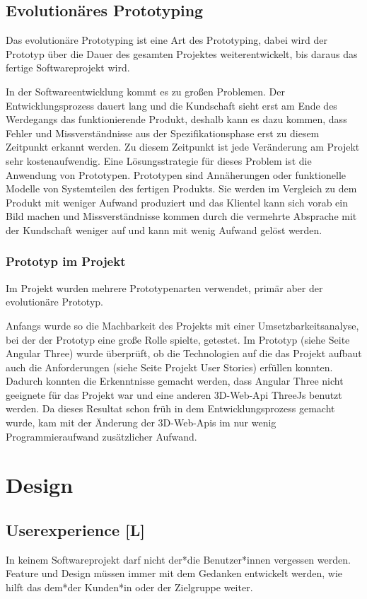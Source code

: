\subsection{Evolutionäres Prototyping}
\label{ch::ongoing-prototyping}
Das evolutionäre Prototyping ist eine Art des Prototyping, dabei wird der Prototyp über die Dauer des gesamten Projektes weiterentwickelt, bis daraus das fertige Softwareprojekt wird.

In der Softwareentwicklung kommt es zu großen Problemen. Der Entwicklungsprozess dauert lang und die Kundschaft sieht erst am Ende des Werdegangs das funktionierende Produkt, deshalb kann es dazu kommen, dass Fehler und Missverständnisse aus der Spezifikationsphase erst zu diesem Zeitpunkt erkannt werden. Zu diesem Zeitpunkt ist jede Veränderung am Projekt sehr kostenaufwendig. Eine Lösungsstrategie für dieses Problem ist die Anwendung von Prototypen. Prototypen sind Annäherungen oder funktionelle Modelle von Systemteilen des fertigen Produkts. Sie werden im Vergleich zu dem Produkt mit weniger Aufwand produziert und das Klientel kann sich vorab ein Bild machen und Missverständnisse kommen durch die vermehrte Absprache mit der Kundschaft weniger auf und kann mit wenig Aufwand gelöst werden. \cite{Prototyping}

\subsubsection{Prototyp im Projekt}
Im Projekt wurden mehrere Prototypenarten verwendet, primär aber der evolutionäre Prototyp.

Anfangs wurde so die Machbarkeit des Projekts mit einer Umsetzbarkeitsanalyse, bei der der Prototyp eine große Rolle spielte, getestet. Im Prototyp (siehe Seite \pageref{ch:Technologien:AngularThree} Angular Three) wurde überprüft, ob die Technologien auf die das Projekt aufbaut auch die Anforderungen (siehe Seite \pageref{ch:umsetzung:projekt-user-stories} Projekt User Stories) erfüllen konnten. Dadurch konnten die Erkenntnisse gemacht werden, dass Angular Three nicht geeignete für das Projekt war und eine anderen 3D-Web-Api ThreeJs benutzt werden. Da dieses Resultat schon früh in dem Entwicklungsprozess gemacht wurde, kam mit der Änderung der 3D-Web-Apis im nur wenig Programmieraufwand zusätzlicher Aufwand.

\section{Design}
\subsection{Userexperience [L]}
In keinem Softwareprojekt darf nicht der*die Benutzer*innen vergessen werden. Feature und Design müssen immer mit dem Gedanken entwickelt werden, wie hilft das dem*der Kunden*in oder der Zielgruppe weiter.


